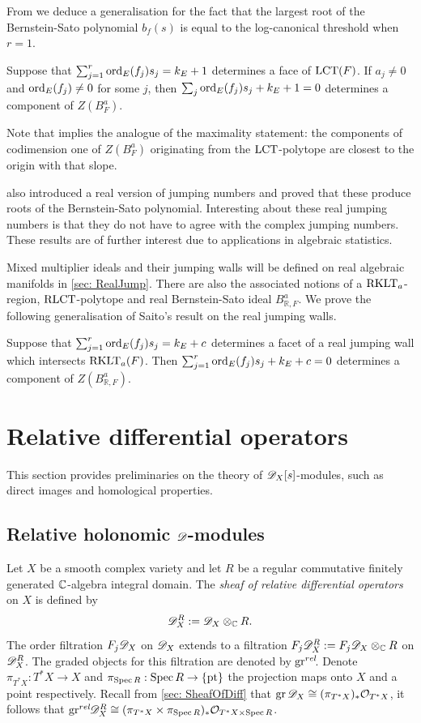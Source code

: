 From  we deduce a generalisation for the fact that the largest root of the Bernstein-Sato polynomial $b_f(s)$ is equal to the log-canonical threshold when $r=1$.
\begin{corollary}\label{thm: LCT}
  Suppose that $\sum_{j=1}^r \operatorname{ord}_E(f_j)s_j = k_E + 1$ determines a face of $\operatorname{LCT}(F)$. If $a_j\neq 0$ and $\operatorname{ord}_{E}(f_j)\neq 0$ for some $j$, then $\sum_j \operatorname{ord}_{E}(f_j)s_j +k_E + 1=0$ determines a component of $Z(B_F^a)$.
\end{corollary}
Note that  implies the analogue of the maximality statement: the components of codimension one of $Z(B_F^a)$ originating from the $\operatorname{LCT}$-polytope are closest to the origin with that slope.

\cite{RealLogCan} also introduced a real version of jumping numbers and proved that these produce roots of the Bernstein-Sato polynomial.
Interesting about these real jumping numbers is that they do not have to agree with the complex jumping numbers.
These results are of further interest due to applications in algebraic statistics.

Mixed multiplier ideals and their jumping walls will be defined on real algebraic manifolds in \cref{sec: RealJump}.
There are also the associated notions of a $\operatorname{RKLT}_a$-region,  $\operatorname{RLCT}$-polytope and real Bernstein-Sato ideal $B_{\mathbb{R},F}^a$.
We prove the following generalisation of Saito's result on the real jumping walls.
\begin{theorem}
  Suppose that $\sum_{j=1}^r \operatorname{ord}_E(f_j)s_j = k_E + c$ determines a facet of a real jumping wall which intersects $\operatorname{RKLT}_{a}(F)$.
  Then $\sum_{j=1}^r \operatorname{ord}_E(f_j)s_j + k_E + c = 0$ determines a component of $Z(B_{\mathbb{R},F}^a)$.
\end{theorem}

\section{Relative differential operators}\label{sec: DXS}
This section provides preliminaries on the theory of $\mathscr{D}_X[s]$-modules, such as direct images and homological properties.

\subsection{Relative holonomic $\mathscr{D}$-modules}\label{sec: RelHol}
Let $X$ be a smooth complex variety and let $R$ be a regular commutative finitely generated $\mathbb{C}$-algebra integral domain.
The {\it sheaf of relative differential operators} on $X$ is defined by
$$\mathscr{D}_X^R := \mathscr{D}_X \otimes_{\mathbb{C}} R.$$
The order filtration $F_j \mathscr{D}_X$ on $\mathscr{D}_X$ extends to a filtration $F_j \mathscr{D}_X^R := F_j\mathscr{D}_X\otimes_{\mathbb{C}} R$ on $\mathscr{D}_X^R$.
The graded objects for this filtration are denoted by $\operatorname{gr}^{rel}\mkern-5mu$.
Denote $\pi_{T^*X}:T^*X \to X$ and $\pi_{\operatorname{Spec} R}: \operatorname{Spec} R \to \{\operatorname{pt}\}$ the projection maps onto $X$ and a point respectively.
Recall from \cref{sec: SheafOfDiff} that $\operatorname{gr}\mathscr{D}_X \cong (\pi_{T^*X})_* \mathcal{O}_{T^*X}$, it follows that $\operatorname{gr}^{rel}\mkern-5mu\mathscr{D}_X^R \cong (\pi_{T^* X}\times \pi_{\operatorname{Spec} R})_*\mathcal{O}_{T^*X\times \operatorname{Spec} R}$.



